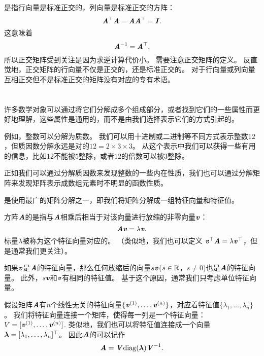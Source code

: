是指行向量是标准正交的，列向量是标准正交的方阵：
\begin{equation}
    \MA^\top\MA=\MA\MA^\top=\MI.
\end{equation}
这意味着 
\begin{equation}
    \MA^{-1}=\MA^\top,
\end{equation}
所以正交矩阵受到关注是因为求逆计算代价小。
需要注意正交矩阵的定义。
反直觉地，正交矩阵的行向量不仅是正交的，还是标准正交的。
对于行向量或列向量互相正交但不是标准正交的矩阵没有对应的专有术语。




\section{}
\label{sec:eigendecomposition}

许多数学对象可以通过将它们分解成多个组成部分，或者找到它们的一些属性而更好地理解，这些属性是通用的，而不是由我们选择表示它们的方式引起的。


例如，整数可以分解为质数。
我们可以用十进制或二进制等不同方式表示整数$12$，但质因数分解永远是对的$12=2\times 3\times 3$。
从这个表示中我们可以获得一些有用的信息，比如$12$不能被$5$整除，或者$12$的倍数可以被$3$整除。


正如我们可以通过分解质因数来发现整数的一些内在性质，我们也可以通过分解矩阵来发现矩阵表示成数组元素时不明显的函数性质。


是使用最广的矩阵分解之一，即我们将矩阵分解成一组特征向量和特征值。


方阵$\MA$的是指与$\MA$相乘后相当于对该向量进行放缩的非零向量$\Vv$：
\begin{equation}
    \MA\Vv=\lambda \Vv.
\end{equation}
标量$\lambda$被称为这个特征向量对应的。
（类似地，我们也可以定义 $\Vv^\top\MA=\lambda \Vv^\top$，但是通常我们更关注）。


如果$\Vv$是$\MA$的特征向量，那么任何放缩后的向量$s\Vv$($s\in \SetR$，$s\neq 0$)也是$\MA$的特征向量。
此外，$s\Vv$和$\Vv$有相同的特征值。
基于这个原因，通常我们只考虑单位特征向量。


假设矩阵$\MA$有$n$个线性无关的特征向量$\{\Vv^{(1)}, \dots, \Vv^{(n)}\}$，对应着特征值$\{\lambda_1, \dots , \lambda_n \}$。
我们将特征向量连接一个矩阵，使得每一列是一个特征向量：$V=[\Vv^{(1)}, \dots, \Vv^{(n)}]$.
类似地，我们也可以将特征值连接成一个向量$\Vlambda = [\lambda_1, \dots , \lambda_n]^\top$。
因此$\MA$的可以记作
\begin{equation}
    \MA = \MV \text{diag}(\Vlambda) \MV^{-1}.
\end{equation}


